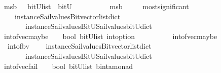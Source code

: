 \begin{isabellebody}
\isanewline
\isanewline
%
\isanewline
{}\isamarkupfalse%
\ msb\ \ {\isacharcolon}{\isacharcolon}\ {\isachardoublequoteopen}{\isacharparenleft}bitU{\isacharparenright}list\ {\isasymRightarrow}\ bitU\ {\isachardoublequoteclose}\ \ \ \isanewline
\ \ \ \ \ {\isachardoublequoteopen}\ msb\ {\isacharequal}\ {\isacharparenleft}\ \isanewline
\ \ most{\isacharunderscore}significant\isanewline
\ \ \ \ {\isacharparenleft}instance{\isacharunderscore}Sail{}{\isacharunderscore}values{\isacharunderscore}Bitvector{\isacharunderscore}list{\isacharunderscore}dict\isanewline
\ \ \ \ \ \ \ instance{\isacharunderscore}Sail{}{\isacharunderscore}values{\isacharunderscore}BitU{\isacharunderscore}Sail{}{\isacharunderscore}values{\isacharunderscore}bitU{\isacharunderscore}dict{\isacharparenright}\ {\isacharparenright}{\isachardoublequoteclose}\isanewline
\isanewline
\isanewline
%
\isanewline
{}\isamarkupfalse%
\ int{\isacharunderscore}of{\isacharunderscore}vec{\isacharunderscore}maybe\ \ {\isacharcolon}{\isacharcolon}\ {\isachardoublequoteopen}\ bool\ {\isasymRightarrow}{\isacharparenleft}bitU{\isacharparenright}list\ {\isasymRightarrow}{\isacharparenleft}int{\isacharparenright}option\ {\isachardoublequoteclose}\ \ \ \isanewline
\ \ \ \ \ {\isachardoublequoteopen}\ int{\isacharunderscore}of{\isacharunderscore}vec{\isacharunderscore}maybe\ {\isacharequal}\ {\isacharparenleft}\ \isanewline
\ \ int{\isacharunderscore}of{\isacharunderscore}bv\isanewline
\ \ \ \ {\isacharparenleft}instance{\isacharunderscore}Sail{}{\isacharunderscore}values{\isacharunderscore}Bitvector{\isacharunderscore}list{\isacharunderscore}dict\isanewline
\ \ \ \ \ \ \ instance{\isacharunderscore}Sail{}{\isacharunderscore}values{\isacharunderscore}BitU{\isacharunderscore}Sail{}{\isacharunderscore}values{\isacharunderscore}bitU{\isacharunderscore}dict{\isacharparenright}\ {\isacharparenright}{\isachardoublequoteclose}\isanewline
\isanewline
{}\isamarkupfalse%
\ int{\isacharunderscore}of{\isacharunderscore}vec{\isacharunderscore}fail\ \ {\isacharcolon}{\isacharcolon}\ {\isachardoublequoteopen}\ bool\ {\isasymRightarrow}{\isacharparenleft}bitU{\isacharparenright}list\ {\isasymRightarrow}{\isacharparenleft}{\isacharprime}b{\isacharcomma}{\isacharparenleft}int{\isacharparenright}{\isacharcomma}{\isacharprime}a{\isacharparenright}monad\ {\isachardoublequoteclose}\ \ \ \isanewline

\end{isabellebody}
